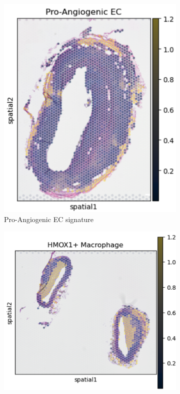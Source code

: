 \documentclass[a4paper,12pt]{article}
\begin{document}
\begin{figure}[H]
\centering
\begin{subfigure}{0.3\textwidth}
\includegraphics[width=\textwidth]{paecpa4}
\caption{Pro-Angiogenic EC signature}
\label{fig:control_spatial}
\end{subfigure}
\hfill
\begin{subfigure}{0.3\textwidth}
\includegraphics[width=\textwidth]{hmoxpa5}

\end{subfigure}
\end{figure}
\end{document}
